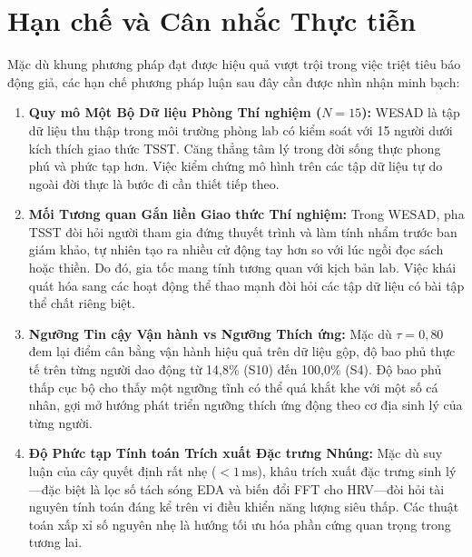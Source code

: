 \documentclass[conference]{IEEEtran}
\begin{document}
\section{Hạn chế và Cân nhắc Thực tiễn}
Mặc dù khung phương pháp đạt được hiệu quả vượt trội trong việc triệt tiêu báo động giả, các hạn chế phương pháp luận sau đây cần được nhìn nhận minh bạch:
\begin{enumerate}
    \item \textbf{Quy mô Một Bộ Dữ liệu Phòng Thí nghiệm ($N=15$):} WESAD là tập dữ liệu thu thập trong môi trường phòng lab có kiểm soát với 15 người dưới kích thích giao thức TSST. Căng thẳng tâm lý trong đời sống thực phong phú và phức tạp hơn. Việc kiểm chứng mô hình trên các tập dữ liệu tự do ngoài đời thực là bước đi cần thiết tiếp theo.
    \item \textbf{Mối Tương quan Gắn liền Giao thức Thí nghiệm:} Trong WESAD, pha TSST đòi hỏi người tham gia đứng thuyết trình và làm tính nhẩm trước ban giám khảo, tự nhiên tạo ra nhiều cử động tay hơn so với lúc ngồi đọc sách hoặc thiền. Do đó, gia tốc mang tính tương quan với kịch bản lab. Việc khái quát hóa sang các hoạt động thể thao mạnh đòi hỏi các tập dữ liệu có bài tập thể chất riêng biệt.
    \item \textbf{Ngưỡng Tin cậy Vận hành vs Ngưỡng Thích ứng:} Mặc dù $\tau = 0,80$ đem lại điểm cân bằng vận hành hiệu quả trên dữ liệu gộp, độ bao phủ thực tế trên từng người dao động từ 14,8\% (S10) đến 100,0\% (S4). Độ bao phủ thấp cục bộ cho thấy một ngưỡng tĩnh có thể quá khắt khe với một số cá nhân, gợi mở hướng phát triển ngưỡng thích ứng động theo cơ địa sinh lý của từng người.
    \item \textbf{Độ Phức tạp Tính toán Trích xuất Đặc trưng Nhúng:} Mặc dù suy luận của cây quyết định rất nhẹ ($< 1$\,ms), khâu trích xuất đặc trưng sinh lý—đặc biệt là lọc số tách sóng EDA và biến đổi FFT cho HRV—đòi hỏi tài nguyên tính toán đáng kể trên vi điều khiển năng lượng siêu thấp. Các thuật toán xấp xỉ số nguyên nhẹ là hướng tối ưu hóa phần cứng quan trọng trong tương lai.
\end{enumerate}

\end{document}
